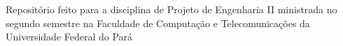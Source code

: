 Repositório feito para a disciplina de Projeto de Engenharia II ministrada no segundo semestre na Faculdade de Computação e Telecomunicações da Universidade Federal do Pará 